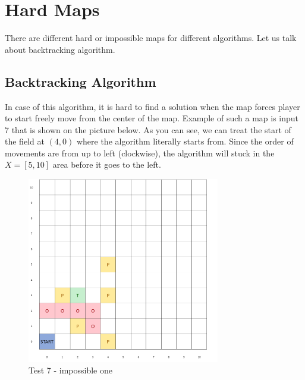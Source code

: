 \documentclass{article}
\begin{document}
\section{Hard Maps}
There are different hard or impossible maps for different algorithms. 
Let us talk about backtracking algorithm.
\subsection{Backtracking Algorithm}
In case of this algorithm, it is hard to find a solution when the map forces player to start freely move from the center of the map. Example of such a map is input 7 that is shown on the picture below. As you can see, we can treat the start of the field at $(4, 0)$ where the algorithm literally starts from. Since the order of movements are from up to left (clockwise), the algorithm will stuck in the $X = [5, 10]$ area before it goes to the left.
\begin{figure}[ht]
        \centering
        \includegraphics[width=0.75\textwidth]{images/image3.png}
        \caption{Test 7 - impossible one}
        \label{fig:test7}
\end{figure}
\end{document}
